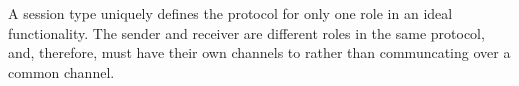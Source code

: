A session type uniquely defines the protocol for only one role in an ideal functionality.
The sender and receiver are different roles in the same protocol, and, therefore, must have their own channels to \Fcom rather than communcating over a common channel.


%

